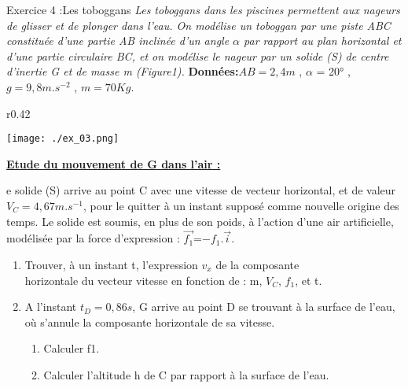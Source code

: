 \documentclass[12pt, french]{article}
\begin{document}
\begin{Box2}{Exercice 4 :Les toboggans}
	\emph{Les toboggans dans les piscines permettent aux nageurs de glisser et de plonger
dans l’eau.
On modélise un toboggan par une piste ABC constituée d’une partie AB inclinée
d’un angle $\alpha$ par rapport au plan horizontal et d’une partie circulaire BC, et on
modélise le nageur par un solide (S) de centre d’inertie G et de masse m (Figure1). }
\textbf{Données:}$AB = 2,4 m$ , $\alpha$ = 20° , $g = 9,8 m.s^{-2}$ , $m = 70 Kg.$ 
	\begin{wrapfigure}[7]{r}{0.42\textwidth}
  \begin{center}

	  \vspace{-1.2cm}
	\texttt{[image: ./ex\_03.png]}
  \end{center}
\end{wrapfigure}

\textbf{\underline{Etude du mouvement de G dans l’air :}}

e solide (S) arrive au point C avec une
vitesse de vecteur horizontal, et de valeur
$V_C = 4,67 m.s^{-1}$, pour le quitter à un instant
supposé comme nouvelle origine des
temps.
Le solide est soumis, en plus de son poids,
à l’action d’une air artificielle, modélisée
par la force d’expression : $\vec{f_1}$=$ -f_1.\vec{i}$.

\begin{enumerate}
	\item Trouver, à un instant t, l’expression $v_x$ de la composante \\horizontale du
vecteur vitesse en fonction de : m, $V_C$, $f_1$, et t.

\item  A l’instant $t_D = 0,86 s$, G arrive au point D se trouvant à la surface de l’eau,
où s’annule la composante horizontale de sa vitesse.
\begin{enumerate}
	\item Calculer f1.
	\item Calculer l’altitude h de C par rapport à la surface de l’eau.
\end{enumerate}
\end{enumerate}

\end{Box2}
\end{document}
